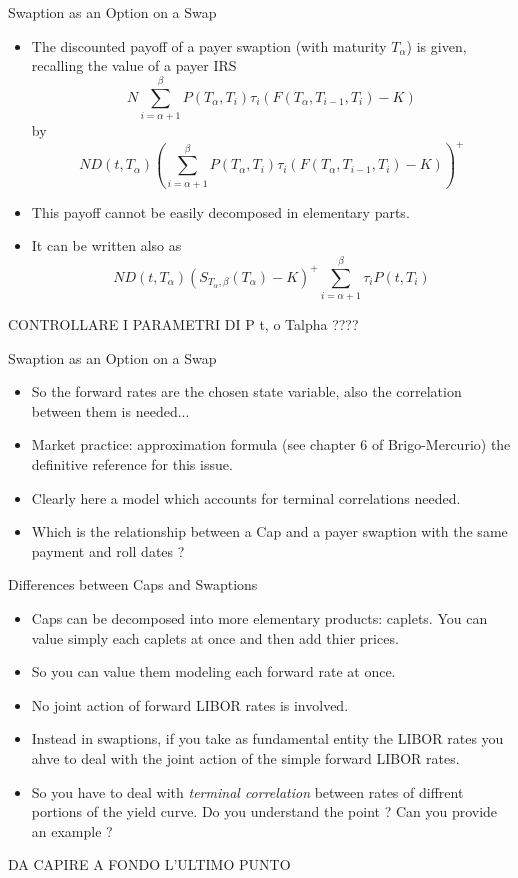 \documentclass{beamer}
\begin{document}
\begin{frame}{Swaption as an Option on a Swap}
	\begin{itemize}
		\item The discounted payoff of a payer swaption (with maturity $T_\alpha$) is given, recalling the value of a payer IRS
		\begin{equation}
			N\sum_{i=\alpha+1}^\beta P(T_\alpha,T_i)\tau_i (F(T_\alpha,T_{i-1},T_i) - K)
		\end{equation}
		by
		\begin{equation}
			ND(t,T_\alpha)\left(\sum_{i=\alpha+1}^\beta P(T_\alpha,T_i)\tau_i (F(T_\alpha,T_{i-1},T_i) - K)\right)^+
		\end{equation}
		\item This payoff cannot be easily decomposed in elementary parts.
		\item It can be written also as
		\begin{equation}
			ND(t,T_\alpha)\left(S_{T_\alpha,\beta}(T_\alpha)-K\right)^+\sum_{i=\alpha+1}^\beta \tau_i P(t,T_i)
		\end{equation}
	\end{itemize}
	CONTROLLARE I PARAMETRI DI P t, o Talpha ????
\end{frame}

\begin{frame}{Swaption as an Option on a Swap}
	\begin{itemize}
		\item So the forward rates are the chosen state variable, also the correlation between them is needed...
		\item Market practice: approximation formula (see chapter 6 of Brigo-Mercurio) the definitive reference for this issue.
		\item Clearly here a model which accounts for terminal correlations needed.
		\item Which is the relationship between a Cap and a payer swaption with the same payment and roll dates ?
	\end{itemize}
\end{frame}


\begin{frame}{Differences between Caps and Swaptions}
	\begin{itemize}
		\item Caps can be decomposed into more elementary products: caplets. You can value simply each caplets at once and then add thier prices.
		\item So you can value them modeling each forward rate at once.
		\item No joint action of forward LIBOR rates is involved.
		\item Instead in swaptions, if you take as fundamental entity the LIBOR rates you ahve to deal with the joint action of the simple forward LIBOR rates. 
		\item So you have to deal with \emph{terminal correlation} between rates of diffrent portions of the yield curve. Do you understand the point ? Can you provide an example ?
	\end{itemize}
	DA CAPIRE A FONDO L'ULTIMO PUNTO
\end{frame}
\end{document}

